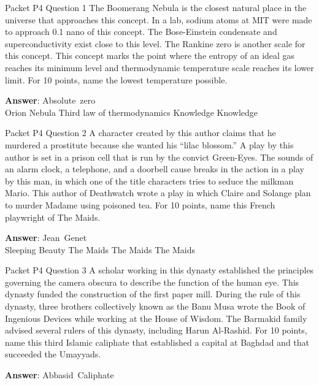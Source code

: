 \begin{frame}{Packet P4 Question 1}
The Boomerang Nebula is   the closest natural place in the universe that approaches this concept. In a lab, sodium atoms at MIT were made to approach 0.1 nano of this concept. The Bose-Einstein condensate and superconductivity exist close to this   level. The Rankine zero is another scale for this concept. This concept marks the point where the entropy of an ideal gas reaches its minimum level and thermodynamic temperature scale reaches its lower limit. For 10 points, name the lowest temperature possible.      

\textbf{Answer}: Absolute\ zero\\
 Orion Nebula
 Third law of thermodynamics
 Knowledge
 Knowledge
\end{frame}

\begin{frame}{Packet P4 Question 2}
A character created by this author claims that he murdered a prostitute because she wanted his “lilac   blossom.” A play by this author is set in a prison cell that is run by the convict Green-Eyes. The sounds   of an alarm clock, a telephone, and a doorbell cause breaks in the action in a play by this man, in which one of the title characters tries to seduce the milkman Mario. This     author of Deathwatch wrote a play in which   Claire and Solange plan to murder Madame using poisoned tea.   For 10 points, name this French playwright of The Maids.  

\textbf{Answer}: Jean\ Genet\\
 Sleeping Beauty
 The Maids
 The Maids
 The Maids
\end{frame}

\begin{frame}{Packet P4 Question 3}
A scholar working in this dynasty established the principles governing the camera obscura to describe the function of the human eye. This dynasty funded the construction of the first paper mill. During the rule of this dynasty, three brothers collectively known as the Banu Musa wrote the Book of Ingenious Devices while working at the House of Wisdom. The Barmakid family advised several   rulers of this dynasty, including Harun Al-Rashid. For     10 points, name this third Islamic caliphate that established   a capital at Baghdad and that succeeded the Umayyads.

\textbf{Answer}: Abbasid\ Caliphate\\
\end{frame}

